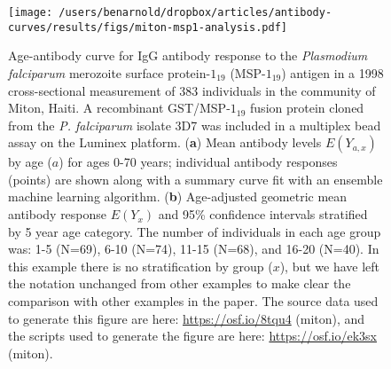 \documentclass[11pt]{article}
\begin{document}
\clearpage
\begin{figure}[htbp]
\begin{center}
\texttt{[image: /users/benarnold/dropbox/articles/antibody-curves/results/figs/miton-msp1-analysis.pdf]}
\begin{minipage}{\textwidth}
\caption{Age-antibody curve for IgG antibody response to the \textit{Plasmodium falciparum} merozoite surface protein-$1_{19}$ (MSP-$1_{19}$) antigen in a 1998 cross-sectional measurement of 383 individuals in the community of Miton, Haiti. A recombinant GST/MSP-$1_{19}$ fusion protein cloned from the \textit{P. falciparum} isolate 3D7 was included in a multiplex bead assay on the Luminex platform. (\textbf{a}) Mean antibody levels $E(Y_{a,x})$ by age ($a$) for ages 0-70 years; individual antibody responses (points) are shown along with a summary curve fit with an ensemble machine learning algorithm. (\textbf{b}) Age-adjusted geometric mean antibody response $E(Y_{x})$ and 95\% confidence intervals stratified by 5 year age category. The number of individuals in each age group was: 1-5 (N=69), 6-10 (N=74), 11-15 (N=68), and 16-20 (N=40). In this example there is no stratification by group ($x$), but we have left the notation unchanged from other examples to make clear the comparison with other examples in the paper. The source data used to generate this figure are here: \url{https://osf.io/8tqu4} (miton), and the scripts used to generate the figure are here: \url{https://osf.io/ek3sx} (miton). }
\label{fig:mitonEYxa}
\end{minipage}
\end{center}
\end{figure}
\end{document}
